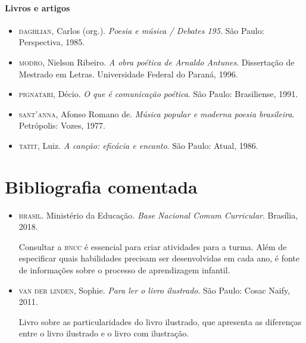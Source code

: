 \documentclass[11pt]{extarticle}
\begin{document}
\paragraph{Livros e artigos}

\begin{itemize}
\item \textsc{daghlian}, Carlos (org.). \textit{Poesia e música / Debates 195}. São Paulo: Perspectiva, 1985.

\item \textsc{modro}, Nielson Ribeiro. \textit{A obra poética de Arnaldo Antunes}. Dissertação de Mestrado em Letras. 
Universidade Federal do Paraná, 1996.

\item \textsc{pignatari}, Décio. \textit{O que é comunicação poética}. São Paulo: Brasiliense, 1991.

\item \textsc{sant'anna}, Afonso Romano de. \textit{Música popular e moderna poesia brasileira}. Petrópolis: Vozes, 1977.

\item \textsc{tatit}, Luiz. \textit{A canção: eficácia e encanto}. São Paulo: Atual, 1986.
\end{itemize}

\section{Bibliografia comentada}

\begin{itemize}
\item \textsc{brasil}. Ministério da Educação. \textit{Base Nacional Comum Curricular}. Brasília, 2018.

Consultar a \textsc{bncc} é essencial para criar atividades para a turma. Além de especificar 
quais habilidades precisam ser desenvolvidas em cada ano, é fonte de informações sobre 
o processo de aprendizagem infantil. 

 
\item \textsc{van der linden}, Sophie. \textit{Para ler o livro ilustrado}. São Paulo: Cosac Naify, 2011.

Livro sobre as particularidades do livro ilustrado, que apresenta as diferenças entre o livro ilustrado e o livro com ilustração. 
\end{itemize}
\end{document}
